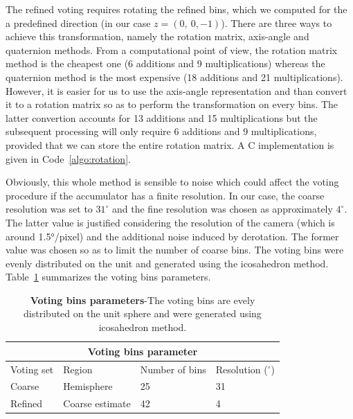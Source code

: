 The refined voting requires rotating the refined bins, which we computed for the a predefined direction (in our case $z = (0,~ 0,-1)$). There are three ways to achieve this transformation, namely the rotation matrix, axis-angle and quaternion methods. From a computational point of view, the rotation matrix method is the cheapest one (6 additions and 9 multiplications) whereas the quaternion method is the most expensive (18 additions and 21 multiplications). However, it is easier for us to use the axis-angle representation and than convert it to a rotation matrix so as to perform the transformation on every bins. The latter convertion accounts for 13 additions and 15 multiplications but the subsequent processing will only require 6 additions and 9 multiplications, provided that we can store the entire rotation matrix. A C implementation is given in Code~\ref{algo:rotation}.

Obviously, this whole method is sensible to noise which could affect the voting procedure if the accumulator has a finite resolution. In our case, the coarse resolution was set to $31^\circ$ and the fine resolution was chosen as approximately $4^\circ$. The latter value is justified considering the resolution of the camera (which is around 1.5°/pixel) and the additional noise induced by derotation. The former value was chosen so as to limit the number of coarse bins. The voting bins were evenly distributed on the unit and generated using the icosahedron method. Table~\ref{tab:votingBins} summarizes the voting bins parameters.

\begin{table}[h!]
	\centering
	\begin{tabular}{|p{2cm}||p{3cm}|p{3cm}|p{3cm}|}
	   \hline
	   \multicolumn{4}{|c|}{Voting bins parameter} \\
	   \hline
	   Voting set & Region & Number of bins & Resolution ($^\circ$) \\
	   \hline
	   Coarse & Hemisphere & 25 & 31\\
	   \hline
	   Refined & Coarse estimate & 42 & 4\\
	   \hline
	\end{tabular}
	\caption{\textbf{Voting bins parameters}-The voting bins are evely distributed on the unit sphere and were generated using icosahedron method.}
	\label{tab:votingBins}
\end{table}

